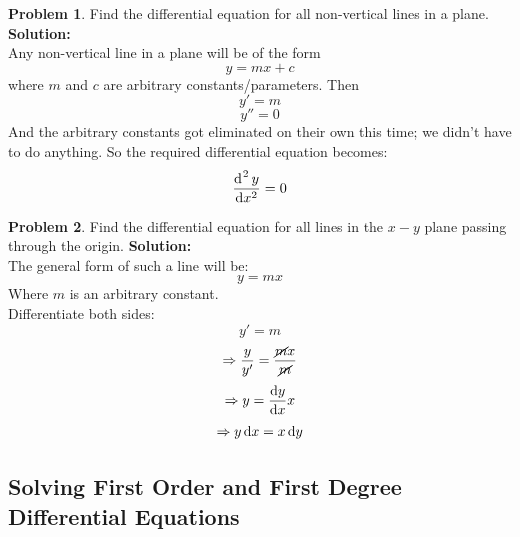 \documentclass[14]{article}
\theoremstyle{definition}
\newtheorem{prob}{Problem}
\theoremstyle{case}
\begin{document}
\pagebreak
\begin{prob}
Find the differential equation for all non-vertical lines in a plane.\\
\textbf{Solution:}\\
Any non-vertical line in a plane will be of the form
\[y = mx + c\]
where $m$ and $c$ are arbitrary constants/parameters.
Then
\[y' = m\]
\[y''=0\]
And the arbitrary constants got eliminated on their own this time; we didn't have to do anything. So the required differential equation becomes:
\[\dfrac{\dif^{\; 2} y}{\dif x^2} = 0\]
\end{prob}
\begin{prob}
Find the differential equation for all lines in the $x-y$ plane passing through the origin.
\textbf{Solution:}\\
The general form of such a line will be:
\[y = mx\]
Where $m$ is an arbitrary constant.\\
Differentiate both sides:
\[y' = m\]
\[\Rightarrow \dfrac{y}{y'} = \dfrac{\cancel{m}x}{\cancel{m}}\]
\[\Rightarrow y = \dfrac{\dif y}{\dif x} x\]
\[\Rightarrow y \dif x = x \dif y\]
\end{prob}
\subsection{Solving First Order and First Degree Differential Equations}
\end{document}
